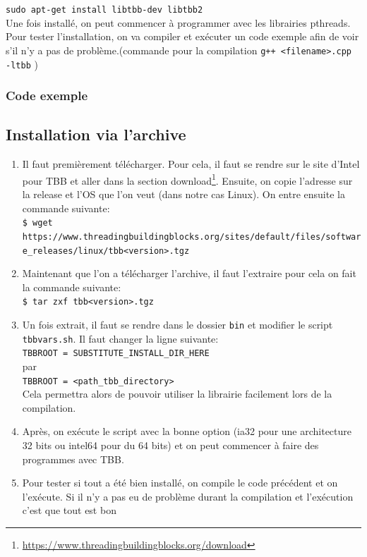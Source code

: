 \documentclass[10pt,a4paper]{article}
\begin{document}
\texttt{sudo apt-get install libtbb-dev libtbb2}\\

Une fois installé, on peut commencer à programmer avec les librairies pthreads. Pour tester l'installation, on va compiler et exécuter un code exemple afin de voir s'il n'y a pas de problème.(commande pour la compilation \texttt{g++ <filename>.cpp -ltbb} )

\subsubsection{Code exemple}


\newpage

\subsection{Installation via l'archive}

\begin{enumerate}

	\item Il faut premièrement télécharger. Pour cela, il faut se rendre sur le site d'Intel pour TBB et aller dans la section download\footnote{\url{https://www.threadingbuildingblocks.org/download}}. Ensuite, on copie l'adresse sur la release et l'OS que l'on veut (dans notre cas Linux). On entre ensuite la commande suivante:\\
	\texttt{\$ wget https://www.threadingbuildingblocks.org/sites/default/files/\linebreak software\_releases/linux/tbb<version>.tgz}
	
	\item Maintenant que l'on a télécharger l'archive, il faut l'extraire pour cela on fait la commande suivante:\\
	\texttt{\$ tar zxf tbb<version>.tgz}
	\item Un fois extrait, il faut se rendre dans le dossier \texttt{bin} et modifier le script \texttt{tbbvars.sh}. Il faut changer la ligne suivante:\\
	\texttt{TBBROOT = SUBSTITUTE\_INSTALL\_DIR\_HERE} \\
	par\\
	\texttt{TBBROOT = <path\_tbb\_directory>}\\
	Cela permettra alors de pouvoir utiliser la librairie facilement lors de la compilation.
	\item Après, on exécute le script avec la bonne option (ia32 pour une architecture 32 bits ou intel64 pour du 64 bits) et on peut commencer à faire des programmes avec TBB.
	\item Pour tester si tout a été bien installé, on compile le code précédent et on l'exécute.
	Si il n'y a pas eu de problème durant la compilation et l'exécution c'est que tout est bon
\end{enumerate}
\end{document}

